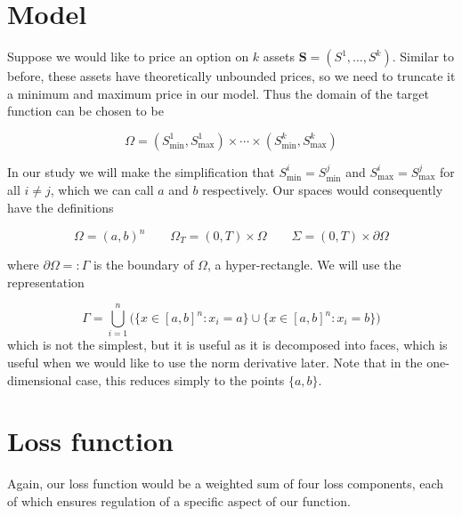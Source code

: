 \section{Model}
Suppose we would like to price an option on $k$ assets $\bm S = (S^1, \dots, S^k)$. Similar to before, these assets have theoretically unbounded prices, so we need to truncate it a minimum and maximum price in our model. Thus the domain of the target function can be chosen to be

$$\Omega = (S_\text{min}^1, S_\text{max}^1) \times \cdots \times (S_\text{min}^k, S_\text{max}^k)$$

In our study we will make the simplification that $S_\text{min}^i = S_\text{min}^j$ and $S_\text{max}^i = S_\text{max}^j$ for all $i \ne j$, which we can call $a$ and $b$ respectively. Our spaces would consequently have the definitions

$$\Omega = (a, b)^n \qquad \Omega_T = (0, T) \times \Omega \qquad \Sigma = (0, T) \times \partial \Omega$$

where $\partial \Omega =: \Gamma$ is the boundary of $\Omega$, a hyper-rectangle. We will use the representation

$$\Gamma = \bigcup_{i=1}^n \big(\{x \in [a, b]^n : x_i = a\} \cup \{x \in [a, b]^n : x_i = b\} \big)$$
which is not the simplest, but it is useful as it is decomposed into faces, which is useful when we would like to use the norm derivative later. Note that in the one-dimensional case, this reduces simply to the points $\{a, b\}$.

\section{Loss function}
Again, our loss function would be a weighted sum of four loss components, each of which ensures regulation of a specific aspect of our function.

